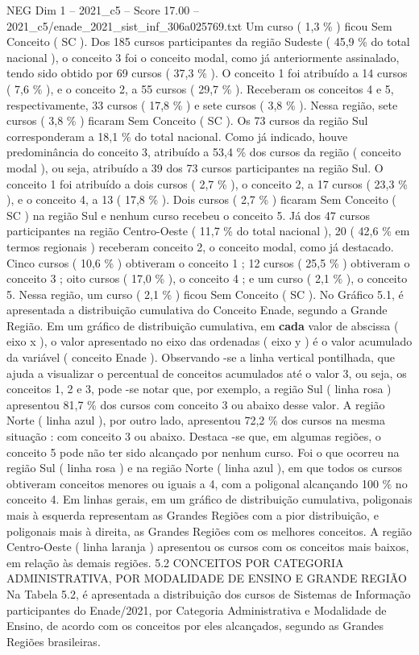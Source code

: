 \begin{textsample}{NEG Dim 1 – 2021\_c5 – Score 17.00 – 2021\_c5/enade\_2021\_sist\_inf\_306a025769.txt}
Um curso ( 1,3 \% ) ficou Sem Conceito ( SC ).
Dos 185 cursos participantes da região Sudeste ( 45,9 \% do total nacional ), o conceito 3 foi o conceito modal, como já anteriormente assinalado, tendo sido obtido por 69 cursos ( 37,3 \% ).
O conceito 1 foi atribuído a 14 cursos ( 7,6 \% ), e o conceito 2, a 55 cursos ( 29,7 \% ).
Receberam os conceitos 4 e 5, respectivamente, 33 cursos ( 17,8 \% ) e sete cursos ( 3,8 \% ).
Nessa região, sete cursos ( 3,8 \% ) ficaram Sem Conceito ( SC ).
Os 73 cursos da região Sul corresponderam a 18,1 \% do total nacional.
Como já indicado, houve predominância do conceito 3, atribuído a 53,4 \% dos cursos da região ( conceito modal ), ou seja, atribuído a 39 dos 73 cursos participantes na região Sul.
O conceito 1 foi atribuído a dois cursos ( 2,7 \% ), o conceito 2, a 17 cursos ( 23,3 \% ), e o conceito 4, a 13 ( 17,8 \% ).
Dois cursos ( 2,7 \% ) ficaram Sem Conceito ( SC ) na região Sul e nenhum curso recebeu o conceito 5.
Já dos 47 cursos participantes na região Centro-Oeste ( 11,7 \% do total nacional ), 20 ( 42,6 \% em termos regionais ) receberam conceito 2, o conceito modal, como já destacado.
Cinco cursos ( 10,6 \% ) obtiveram o conceito 1 ; 12 cursos ( 25,5 \% ) obtiveram o conceito 3 ; oito cursos ( 17,0 \% ), o conceito 4 ; e um curso ( 2,1 \% ), o conceito 5.
Nessa região, um curso ( 2,1 \% ) ficou Sem Conceito ( SC ).
No Gráfico 5.1, é apresentada a distribuição cumulativa do Conceito Enade, segundo a Grande Região.
Em um gráfico de distribuição cumulativa, em \textbf{cada} valor de abscissa ( eixo x ), o valor apresentado no eixo das ordenadas ( eixo y ) é o valor acumulado da variável ( conceito Enade ).
Observando -se a linha vertical pontilhada, que ajuda a visualizar o percentual de conceitos acumulados até o valor 3, ou seja, os conceitos 1, 2 e 3, pode -se notar que, por exemplo, a região Sul ( linha rosa ) apresentou 81,7 \% dos cursos com conceito 3 ou abaixo desse valor.
A região Norte ( linha azul ), por outro lado, apresentou 72,2 \% dos cursos na mesma situação : com conceito 3 ou abaixo.
Destaca -se que, em algumas regiões, o conceito 5 pode não ter sido alcançado por nenhum curso.
Foi o que ocorreu na região Sul ( linha rosa ) e na região Norte ( linha azul ), em que todos os cursos obtiveram conceitos menores ou iguais a 4, com a poligonal alcançando 100 \% no conceito 4.
Em linhas gerais, em um gráfico de distribuição cumulativa, poligonais mais à esquerda representam as Grandes Regiões com a pior distribuição, e poligonais mais à direita, as Grandes Regiões com os melhores conceitos.
A região Centro-Oeste ( linha laranja ) apresentou os cursos com os conceitos mais baixos, em relação às demais regiões. 5.2 CONCEITOS POR CATEGORIA ADMINISTRATIVA, POR MODALIDADE DE ENSINO E GRANDE REGIÃO Na Tabela 5.2, é apresentada a distribuição dos cursos de Sistemas de Informação participantes do Enade/2021, por Categoria Administrativa e Modalidade de Ensino, de acordo com os conceitos por eles alcançados, segundo as Grandes Regiões brasileiras.

\end{textsample}
